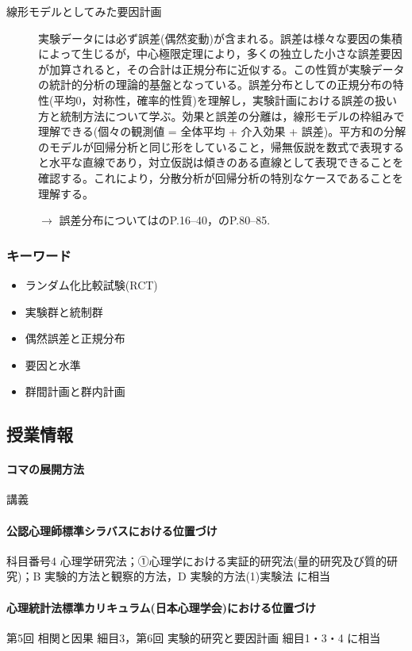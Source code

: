 \begin{description}
	\item[線形モデルとしてみた要因計画] 実験データには必ず誤差(偶然変動)が含まれる。誤差は様々な要因の集積によって生じるが，中心極限定理により，多くの独立した小さな誤差要因が加算されると，その合計は正規分布に近似する。この性質が実験データの統計的分析の理論的基盤となっている。誤差分布としての正規分布の特性(平均0，対称性，確率的性質)を理解し，実験計画における誤差の扱い方と統制方法について学ぶ。効果と誤差の分離は，線形モデルの枠組みで理解できる(個々の観測値 = 全体平均 + 介入効果 + 誤差)。平方和の分解のモデルが回帰分析と同じ形をしていること，帰無仮説を数式で表現すると水平な直線であり，対立仮説は傾きのある直線として表現できることを確認する。これにより，分散分析が回帰分析の特別なケースであることを理解する。
	      \begin{flushright}
		      $\to$ 誤差分布については\textcite{Naganuma2201611}のP.16--40，\textcite{Yamada2004}のP.80--85.
	      \end{flushright}

\end{description}
\subsubsection{キーワード}
\begin{itemize}
	\item ランダム化比較試験(RCT)
	\item 実験群と統制群
	\item 偶然誤差と正規分布
	\item 要因と水準
	\item 群間計画と群内計画
\end{itemize}
\subsection{授業情報}
\paragraph{コマの展開方法}
講義
\paragraph{公認心理師標準シラバスにおける位置づけ}
科目番号4 心理学研究法；①心理学における実証的研究法(量的研究及び質的研究)；B 実験的方法と観察的方法，D 実験的方法(1)実験法 に相当
\paragraph{心理統計法標準カリキュラム(日本心理学会)における位置づけ}
第5回 相関と因果 細目3，第6回 実験的研究と要因計画 細目1・3・4 に相当
